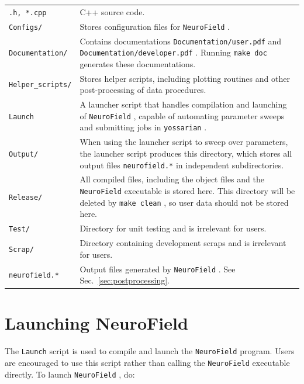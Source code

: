\documentclass[12pt,a4paper]{article}
\newcommand{\type}[1]{ {\small\small\tt #1} }
\newcommand{\NF}[0]{ \type{NeuroField}}
\begin{document}
\begin{tabular}{l p{14.4cm}}
\type{*.h, *.cpp}& C++ source code.\\
\type{Configs/}& Stores configuration files for \NF.\\
\type{Documentation/}& Contains documentations \type{Documentation/user.pdf} and \type{Documentation/developer.pdf}. Running \type{make doc} generates these documentations.\\
\type{Helper\_scripts/}& Stores helper scripts, including plotting routines and other post-processing of data procedures.\\
\type{Launch}& A launcher script that handles compilation and launching of \NF, capable of automating parameter sweeps and submitting jobs in \type{yossarian}.\\
\type{Output/}& When using the launcher script to sweep over parameters, the launcher script produces this directory, which stores all output files \type{neurofield.*} in independent subdirectories.\\
\type{Release/}& All compiled files, including the object files and the \NF executable is stored here. This directory will be deleted by \type{make clean}, so user data should not be stored here.\\
\type{Test/}& Directory for unit testing and is irrelevant for users.\\
\type{Scrap/}& Directory containing development scraps and is irrelevant for users.\\
\type{neurofield.*}& Output files generated by \NF. See Sec.~\ref{sec:postprocessing}.
\end{tabular}

\section{Launching NeuroField}
\label{sec:launch}

The \type{Launch} script is used to compile and launch the \NF program. Users are encouraged to use this script rather than calling the \NF executable directly. To launch \NF, do:
\end{document}
